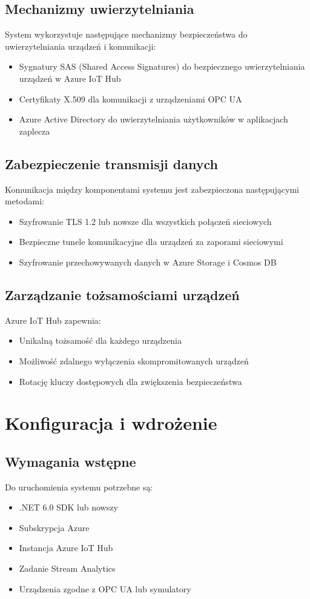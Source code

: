 \documentclass{article}
\begin{document}
\subsection{Mechanizmy uwierzytelniania}
System wykorzystuje następujące mechanizmy bezpieczeństwa do uwierzytelniania urządzeń i komunikacji:
\begin{itemize}
    \item Sygnatury SAS (Shared Access Signatures) do bezpiecznego uwierzytelniania urządzeń w Azure IoT Hub
    \item Certyfikaty X.509 dla komunikacji z urządzeniami OPC UA
    \item Azure Active Directory do uwierzytelniania użytkowników w aplikacjach zaplecza
\end{itemize}

\subsection{Zabezpieczenie transmisji danych}
Komunikacja między komponentami systemu jest zabezpieczona następującymi metodami:
\begin{itemize}
    \item Szyfrowanie TLS 1.2 lub nowsze dla wszystkich połączeń sieciowych
    \item Bezpieczne tunele komunikacyjne dla urządzeń za zaporami sieciowymi
    \item Szyfrowanie przechowywanych danych w Azure Storage i Cosmos DB
\end{itemize}

\subsection{Zarządzanie tożsamościami urządzeń}
Azure IoT Hub zapewnia:
\begin{itemize}
    \item Unikalną tożsamość dla każdego urządzenia
    \item Możliwość zdalnego wyłączenia skompromitowanych urządzeń
    \item Rotację kluczy dostępowych dla zwiększenia bezpieczeństwa
\end{itemize}

\section{Konfiguracja i wdrożenie}
\subsection{Wymagania wstępne}
Do uruchomienia systemu potrzebne są:
\begin{itemize}
    \item .NET 6.0 SDK lub nowszy
    \item Subskrypcja Azure
    \item Instancja Azure IoT Hub
    \item Zadanie Stream Analytics
    \item Urządzenia zgodne z OPC UA lub symulatory
\end{itemize}
\end{document}
